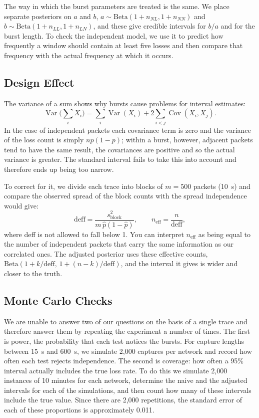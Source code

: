 \documentclass[conference]{IEEEtran}
\begin{document}
The way in which the burst parameters are treated is the same. We place separate posteriors on $a$ and $b$, $a\sim\text{Beta}(1+n_{NL},1+n_{NN})$ and $b\sim\text{Beta}(1+n_{LL},1+n_{LN})$, and these give credible intervals for $b/a$ and for the burst length. To check the independent model, we use it to predict how frequently a window should contain at least five losses and then compare that frequency with the actual frequency at which it occurs.

\subsection{Design Effect}
The variance of a sum shows why bursts cause problems for interval estimates:
\begin{equation}
\operatorname{Var}\Big(\sum_i X_i\Big)=\sum_i\operatorname{Var}(X_i)+2\sum_{i<j}\operatorname{Cov}(X_i,X_j).
\end{equation}
In the case of independent packets each covariance term is zero and the variance of the loss count is simply $np(1-p)$; within a burst, however, adjacent packets tend to have the same result, the covariances are positive and so the actual variance is greater. The standard interval fails to take this into account and therefore ends up being too narrow.

To correct for it, we divide each trace into blocks of $m=500$ packets (10~s) and compare the observed spread of the block counts with the spread independence would give:
\begin{equation}
\text{deff}=\frac{s^2_{\text{block}}}{m\,\hat p(1-\hat p)},\qquad n_{\text{eff}}=\frac{n}{\text{deff}},
\end{equation}
where deff is not allowed to fall below 1. You can interpret $n_{\text{eff}}$ as being equal to the number of independent packets that carry the same information as our correlated ones. The adjusted posterior uses these effective counts, $\text{Beta}(1+k/\text{deff},\,1+(n-k)/\text{deff})$, and the interval it gives is wider and closer to the truth.

\subsection{Monte Carlo Checks}
We are unable to answer two of our questions on the basis of a single trace and therefore answer them by repeating the experiment a number of times. The first is power, the probability that each test notices the bursts. For capture lengths between 15~s and 600~s, we simulate 2{,}000 captures per network and record how often each test rejects independence. The second is coverage: how often a 95\% interval actually includes the true loss rate. To do this we simulate 2,000 instances of 10 minutes for each network, determine the naive and the adjusted intervals for each of the simulations, and then count how many of these intervals include the true value. Since there are 2,000 repetitions, the standard error of each of these proportions is approximately 0.011.
\end{document}
